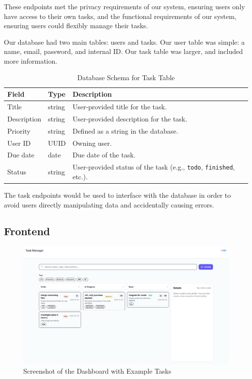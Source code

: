 \documentclass[11pt,oneside]{article}
\begin{document}
These endpoints met the privacy requirements of our system, ensuring users only have access to their own tasks, and the functional requirements of our system, ensuring users could flexibly manage their tasks.

Our database had two main tables: users and tasks. Our user table was simple: a name, email, password, and internal ID. Our task table was larger, and included more information.

\begin{table}[H]
    \centering
    \caption{Database Schema for Task Table}
    \label{tab:database-schema}
    \begin{tabular}{l l p{8cm}}
        \toprule
        \textbf{Field} & \textbf{Type} & \textbf{Description} \\
        \midrule
        Title & string & User-provided title for the task. \\
        Description & string & User-provided description for the task. \\
        Priority & string & Defined as a string in the database. \\
        User ID & UUID & Owning user. \\
        Due date & date & Due date of the task. \\
        Status & string & User-provided status of the task (e.g., \texttt{todo}, \texttt{finished}, etc.). \\
        \bottomrule
    \end{tabular}
\end{table}

The task endpoints would be used to interface with the database in order to avoid users directly manipulating data and accidentally causing errors.

\subsection{Frontend}

\begin{figure}[H]
    \centering
    \includegraphics[width=1.0\textwidth]{dashboard_screenshot.jpeg}
    \caption{Screenshot of the Dashboard with Example Tasks}
    \label{fig:dashboard-screenshot}
\end{figure}
\end{document}
